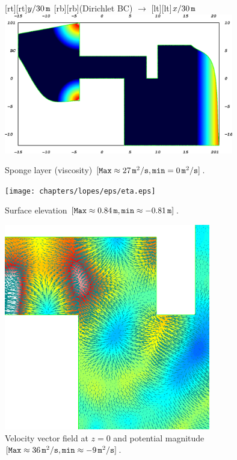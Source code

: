 \begin{figure}[htb!]
{\centering
{}[rt][rt]{$y/ 30\,{\tt m}$}
[rb][rb]{(Dirichlet BC) \(\longrightarrow\)}
[lt][lt]{$x/30\,{\tt m}$}
\includegraphics[width=10cm]{chapters/lopes/eps/sponge.eps}
\caption{Sponge layer (viscosity) \([{\tt Max} \approx 27\,{\tt m}^2/{\tt
s}, {\tt min}=0 \,{\tt m}^2/{\tt s}]\).}\label{fig::harbour_sponge}\par}
\end{figure}
\begin{figure}[!htb]
{\centering
\texttt{[image: chapters/lopes/eps/eta.eps]}
\caption{Surface elevation \([{\tt Max}\approx 0.84\,{\tt
m}, {\tt min}\approx-0.81\,{\tt m}] \).}\label{fig::elevation}\par}
\end{figure}
\begin{figure}[!htb]
{\centering
\includegraphics[width=9cm]{chapters/lopes/eps/pvel2.eps}
\caption{Velocity vector field at $z=0$ and potential magnitude\newline
\([{\tt Max}\approx 36\, {\tt m}^2/{\tt s}, {\tt min}\approx-9\,{\tt m}^2/{\tt s}]\).}\label{fig::potential1}\par}
\end{figure}
